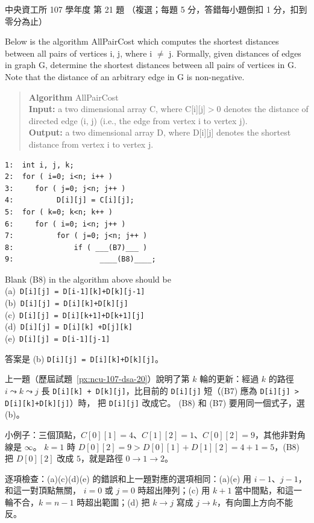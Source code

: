\begin{pastexam}[label={px:ncu-107-dsa-21}]{中央資工所 107 學年度 第 21 題}
（複選；每題 5 分，答錯每小題倒扣 1 分，扣到零分為止）

Below is the algorithm AllPairCost which computes the shortest distances between all pairs of
vertices i, j, where i $\ne$ j. Formally, given distances of edges in graph G, determine the
shortest distances between all pairs of vertices in G. Note that the distance of an arbitrary edge
in G is non-negative.
\begin{quote}
\textbf{Algorithm} AllPairCost\\
\textbf{Input:} a two dimensional array C, where C[i][j]$>$0 denotes the distance of directed edge
(i, j) (i.e., the edge from vertex i to vertex j).\\
\textbf{Output:} a two dimensional array D, where D[i][j] denotes the shortest distance from
vertex i to vertex j.
\end{quote}
\begin{verbatim}
1:  int i, j, k;
2:  for ( i=0; i<n; i++ )
3:     for ( j=0; j<n; j++ )
4:          D[i][j] = C[i][j];
5:  for ( k=0; k<n; k++ )
6:     for ( i=0; i<n; j++ )
7:          for ( j=0; j<n; j++ )
8:              if ( ___(B7)___ )
9:                    ____(B8)____;
\end{verbatim}

Blank (B8) in the algorithm above should be\\
(a)~\texttt{D[i][j] = D[i-1][k]+D[k][j-1]}\\
(b)~\texttt{D[i][j] = D[i][k]+D[k][j]}\\
(c)~\texttt{D[i][j] = D[i][k+1]+D[k+1][j]}\\
(d)~\texttt{D[i][j] = D[i][k] +D[j][k]}\\
(e)~\texttt{D[i][j] = D[i-1][j-1]}
\end{pastexam}

\begin{pastsoln}
答案是 (b) \texttt{D[i][j] = D[i][k]+D[k][j]}。

上一題（歷屆試題~\ref{px:ncu-107-dsa-20}）說明了第 $k$ 輪的更新：經過 $k$ 的路徑 $i \leadsto k \leadsto j$ 長
\texttt{D[i][k] + D[k][j]}，比目前的 \texttt{D[i][j]} 短（(B7) 應為 \texttt{D[i][j] > D[i][k]+D[k][j]}）時，
把 \texttt{D[i][j]} 改成它。 (B8) 和 (B7) 要用同一個式子，選 (b)。

小例子：三個頂點，$C[0][1] = 4$、$C[1][2] = 1$、$C[0][2] = 9$，其他非對角線是 $\infty$。 $k = 1$ 時
$D[0][2] = 9 > D[0][1] + D[1][2] = 4 + 1 = 5$，(B8) 把 $D[0][2]$ 改成 $5$，就是路徑 $0 \to 1 \to 2$。

逐項檢查：(a)(c)(d)(e) 的錯誤和上一題對應的選項相同：(a)(e) 用 $i - 1$、$j - 1$，和這一對頂點無關，
$i = 0$ 或 $j = 0$ 時超出陣列；(c) 用 $k + 1$ 當中間點，和這一輪不合，$k = n - 1$ 時超出範圍；(d) 把
$k \to j$ 寫成 $j \to k$，有向圖上方向不能反。
\end{pastsoln}
